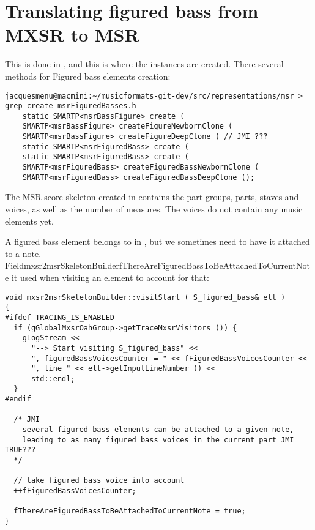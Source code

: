 \section{Translating figured bass from MXSR to MSR}

This is done in \mxsrToMsr{}, and this is where the  instances are created.
There several methods for Figured bass elements creation:%
\begin{lstlisting}[language=Terminal]
jacquesmenu@macmini:~/musicformats-git-dev/src/representations/msr > grep create msrFiguredBasses.h
    static SMARTP<msrBassFigure> create (
    SMARTP<msrBassFigure> createFigureNewbornClone (
    SMARTP<msrBassFigure> createFigureDeepClone ( // JMI ???
    static SMARTP<msrFiguredBass> create (
    static SMARTP<msrFiguredBass> create (
    SMARTP<msrFiguredBass> createFiguredBassNewbornClone (
    SMARTP<msrFiguredBass> createFiguredBassDeepClone ();
\end{lstlisting}

The MSR score skeleton created in  contains the part groups, parts, staves and voices, as well as the number of measures. The voices do not contain any music elements yet.

A figured bass element belongs to  in \mxml, but we sometimes need to have it attached to a note.\\
Field{mxsr2msrSkeletonBuilder}{fThereAreFiguredBassToBeAttachedToCurrentNote} it used when visiting an  element to account for that:%
\begin{lstlisting}[language=CPlusPlus]
void mxsr2msrSkeletonBuilder::visitStart ( S_figured_bass& elt )
{
#ifdef TRACING_IS_ENABLED
  if (gGlobalMxsrOahGroup->getTraceMxsrVisitors ()) {
    gLogStream <<
      "--> Start visiting S_figured_bass" <<
      ", figuredBassVoicesCounter = " << fFiguredBassVoicesCounter <<
      ", line " << elt->getInputLineNumber () <<
      std::endl;
  }
#endif

  /* JMI
    several figured bass elements can be attached to a given note,
    leading to as many figured bass voices in the current part JMI TRUE???
  */

  // take figured bass voice into account
  ++fFiguredBassVoicesCounter;

  fThereAreFiguredBassToBeAttachedToCurrentNote = true;
}
\end{lstlisting}

